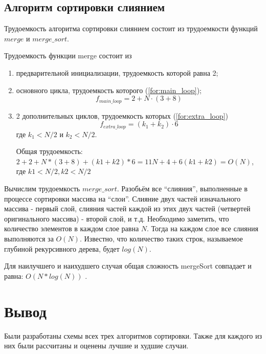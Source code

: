 \subsection{Алгоритм сортировки слиянием}

Трудоемкость алгоритма сортировки слиянием состоит из трудоемкости функций $merge$ и $merge\_sort$.

Трудоемкость функции merge состоит из
\begin{enumerate}[label=\arabic*)]
	\item предварительной инициализации, трудоемкость которой равна 2;
	\item основного цикла, трудоемкость которого (\ref{for:main_loop});
	\begin{equation}
		\label{for:main_loop}
		f_{main\_loop} = 2 + N\cdot(3 + 8)
	\end{equation}
	\item 2 дополнительных циклов, трудоемкость которых (\ref{for:extra_loop})
	\begin{equation}
		\label{for:extra_loop}
		f_{extra\_loop} = (k_1 + k_2)\cdot6
	\end{equation}
	где $k_1 < N/2$ и $k_2 < N/2$.
	
	Общая трудоемкость:  $2 + 2 + N * (3 + 8) + (k1 + k2) * 6 = 11N + 4  + 6(k1 + k2) = O(N)$, где $k1 < N/2, k2  < N/2$
\end{enumerate}

Вычислим трудоемкость $merge\_sort$. Разобьём все “слияния”, выполненные в процессе сортировки массива на “слои”. Слияние двух частей изначального массива - первый слой, слияния частей каждой из этих двух частей (четвертей оригинального массива) - второй слой, и т.д. Необходимо заметить, что количество элементов в каждом слое равна $N$. Тогда на каждом слое все слияния выполняются за $O(N)$. Известно, что количество таких строк, называемое глубиной рекурсивного дерева, будет $log(N)$.

Для наилучшего и наихудшего случая общая сложность mergeSort совпадает и равна: $O(N * log(N))$ \cite{algos}.


\section*{Вывод}

Были разработаны схемы всех трех алгоритмов сортировки. Также для каждого из них были рассчитаны и оценены лучшие и худшие случаи.

